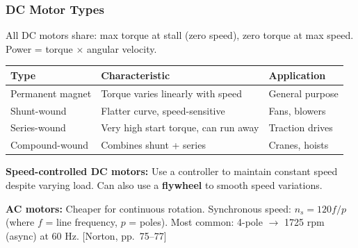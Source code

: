 \documentclass[10pt,aspectratio=43]{beamer}
\newcommand{\pref}[1]{\vfill\hfill{\scriptsize\color{gray}[Norton, pp.~#1]}}
\begin{document}
\begin{frame}
\frametitle{DC Motor Types}

All DC motors share: max torque at stall (zero speed), zero torque at max speed. Power = torque $\times$ angular velocity.

\vspace{6pt}
\begin{center}
\small
\begin{tabular}{l|l|l}
\toprule
\textbf{Type} & \textbf{Characteristic} & \textbf{Application} \\
\midrule
Permanent magnet & Torque varies linearly with speed & General purpose \\
Shunt-wound & Flatter curve, speed-sensitive & Fans, blowers \\
Series-wound & Very high start torque, can run away & Traction drives \\
Compound-wound & Combines shunt + series & Cranes, hoists \\
\bottomrule
\end{tabular}
\end{center}

\vspace{4pt}
\textbf{Speed-controlled DC motors:} Use a controller to maintain constant speed despite varying load. Can also use a \textbf{flywheel} to smooth speed variations.

\vspace{4pt}
\textbf{AC motors:} Cheaper for continuous rotation. Synchronous speed: $n_s = 120f / p$ (where $f$ = line frequency, $p$ = poles). Most common: 4-pole $\to$ 1725 rpm (async) at 60 Hz.
\pref{75--77}
\end{frame}
\end{document}
